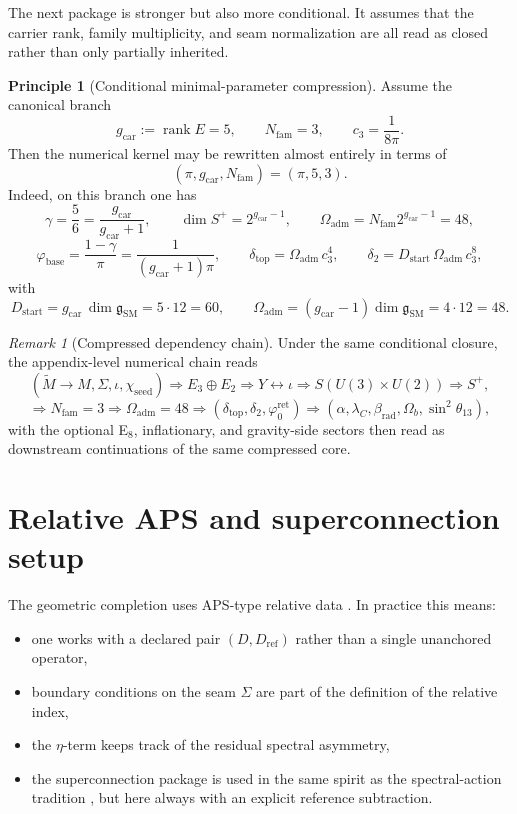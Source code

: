 \documentclass[11pt,a4paper]{article}
\theoremstyle{definition}
\newtheorem{principle}[theorem]{Principle}
\theoremstyle{remark}
\newtheorem*{remark}{Remark}
\DeclareMathOperator{\rank}{rank}
\newcommand{\Seam}{\Sigma}
\newcommand{\inv}{\iota}
\newcommand{\cthree}{c_3}
\newcommand{\phibase}{\varphi_{\mathrm{base}}}
\newcommand{\phiz}{\varphi_0^{\mathrm{ret}}}
\newcommand{\deltatop}{\delta_{\mathrm{top}}}
\newcommand{\SM}{\mathrm{SM}}
\newcommand{\Oadm}{\Omega_{\mathrm{adm}}}
\newcommand{\gcar}{g_{\mathrm{car}}}
\newcommand{\chiseed}{\chi_{\mathrm{seed}}}
\newcommand{\Dstart}{D_{\mathrm{start}}}
\begin{document}
The next package is stronger but also more conditional. It assumes that the carrier rank, family multiplicity, and seam normalization are all read as closed rather than only partially inherited.

\begin{principle}[Conditional minimal-parameter compression]
Assume the canonical branch
\[
\gcar:=\rank E=5,
\qquad
N_{\mathrm{fam}}=3,
\qquad
\cthree=\frac{1}{8\pi}.
\]
Then the numerical kernel may be rewritten almost entirely in terms of
\[
(\pi,\gcar,N_{\mathrm{fam}})=(\pi,5,3).
\]
Indeed, on this branch one has
\[
\gamma=\frac56=\frac{\gcar}{\gcar+1},
\qquad
\dim S^+=2^{\gcar-1},
\qquad
\Oadm=N_{\mathrm{fam}}2^{\gcar-1}=48,
\]
\[
\phibase=\frac{1-\gamma}{\pi}=\frac{1}{(\gcar+1)\pi},
\qquad
\deltatop=\Oadm\,\cthree^4,
\qquad
\delta_2=\Dstart\,\Oadm\,\cthree^8,
\]
with
\[
\Dstart=\gcar\,\dim\mathfrak g_{\SM}=5\cdot 12=60,
\qquad
\Oadm=(\gcar-1)\dim\mathfrak g_{\SM}=4\cdot 12=48.
\]
\end{principle}

\begin{remark}[Compressed dependency chain]
Under the same conditional closure, the appendix-level numerical chain reads
\[
(\widetilde M\to M,\Seam,\inv,\chiseed)
\Longrightarrow
E_3\oplus E_2
\Longrightarrow
Y \leftrightarrow \inv
\Longrightarrow
S(U(3)\times U(2))
\Longrightarrow
S^+,
\]
\[
\Longrightarrow
N_{\mathrm{fam}}=3
\Longrightarrow
\Oadm=48
\Longrightarrow
(\deltatop,\delta_2,\phiz)
\Longrightarrow
(\alpha,\lambda_C,\beta_{\mathrm{rad}},\Omega_b,\sin^2\theta_{13}),
\]
with the optional E$_8$, inflationary, and gravity-side sectors then read as downstream continuations of the same compressed core.
\end{remark}

\section{Relative APS and superconnection setup}
\label{app:aps}

The geometric completion uses APS-type relative data \cite{aps1975}. In practice this means:
\begin{itemize}[leftmargin=1.5em, topsep=3pt, itemsep=2pt]
    \item one works with a declared pair $(D,D_{\mathrm{ref}})$ rather than a single unanchored operator,
    \item boundary conditions on the seam $\Seam$ are part of the definition of the relative index,
    \item the $\eta$-term keeps track of the residual spectral asymmetry,
    \item the superconnection package is used in the same spirit as the spectral-action tradition \cite{chamseddineConnes1997}, but here always with an explicit reference subtraction.
\end{itemize}
\end{document}
